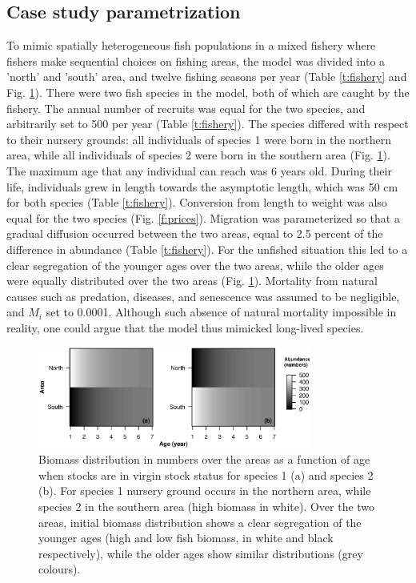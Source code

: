 \documentclass[12pt,oneline,a4paper,numbib]{ouparticle}
\numberwithin{equation}{subsection} %
\begin{document}
\subsection{Case study parametrization}

To mimic spatially heterogeneous fish populations in a mixed fishery where fishers make sequential choices on fishing areas, the model was divided into a 'north' and 'south' area, and twelve fishing seasons per year (Table \ref{t:fishery} and Fig. \ref{f:distribution}). There were two fish species in the model, both of which are caught by the fishery. The annual number of recruits was equal for the two species, and arbitrarily set to 500 per year (Table \ref{t:fishery}). The species differed with respect to their nursery grounds: all individuals of species 1 were born in the northern area, while all individuals of species 2 were born in the southern area (Fig. \ref{f:distribution}). The maximum age that any individual can reach was 6 years old. During their life, individuals grew in length towards the asymptotic length, which was 50 cm for both species (Table \ref{t:fishery}). Conversion from length to weight was also equal for the two species (Fig. \ref{f:prices}). Migration was parameterized so that a gradual diffusion occurred between the two areas, equal to 2.5 percent of the difference in abundance (Table \ref{t:fishery}). For the unfished situation this led to a clear segregation of the younger ages over the two areas, while the older ages were equally distributed over the two areas (Fig. \ref{f:distribution}). Mortality from natural causes such as predation, diseases, and senescence was assumed to be negligible, and $M_i$ set to 0.0001. Although such absence of natural mortality impossible in reality, one could argue that the model thus mimicked long-lived species.

\begin{figure}[!ht]
\centering
\includegraphics[width=0.8\textwidth]{Figures/Distributions.eps} 
\caption{Biomass distribution in numbers over the areas as a function of age when stocks are in virgin stock status for species 1 (a) and species 2 (b). For species 1 nursery ground occurs in the northern area, while species 2 in the southern area (high biomass in white). Over the two areas, initial biomass distribution shows a clear segregation of the younger ages (high and low fish biomass, in white and black respectively), while the older ages show similar distributions (grey colours).}
\label{f:distribution}
\end{figure}
  
\end{document}
